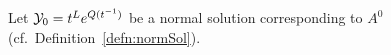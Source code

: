 \begin{defn}
\fi
\end{defn}
Let $\mathcal{Y}_0=t^L e^{Q(t^{-1})}$ be a normal solution corresponding to
$A^0$ (cf.\ Definition~\ref{defn:normSol}).

